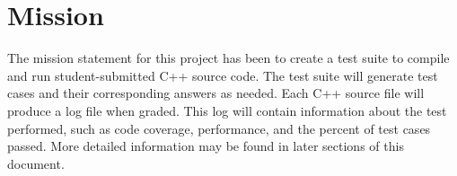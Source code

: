 
\chapter{Mission}

The mission statement for this project has been to create a test suite to compile and run student-submitted C++ source code. The test suite will generate test cases and their corresponding answers as needed. Each C++ source file will produce a log file when graded. This log will contain information about the test performed, such as code coverage, performance, and the percent of test cases passed. More detailed information may be found in later sections of this document.

\let\cleardoublepage\clearpage
